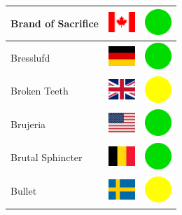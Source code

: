 \documentclass[12pt, a4paper, twoside]{report}
\begin{document}
\begin{center}
\begin{longtable}{|p{5cm}|p{2cm}|p{2cm}|}
 Brand of Sacrifice                                         & \includegraphics[width=1cm]{../img/flags/ca} &   \includegraphics[width=1cm]{../likes/y} \\ \hline
 Bresslufd                                                  & \includegraphics[width=1cm]{../img/flags/de} &   \includegraphics[width=1cm]{../likes/y} \\ \hline
 Broken Teeth                                               & \includegraphics[width=1cm]{../img/flags/gb} &   \includegraphics[width=1cm]{../likes/m} \\ \hline
 Brujeria                                                   & \includegraphics[width=1cm]{../img/flags/us} &   \includegraphics[width=1cm]{../likes/y} \\ \hline
 Brutal Sphincter                                           & \includegraphics[width=1cm]{../img/flags/be} &   \includegraphics[width=1cm]{../likes/y} \\ \hline
 Bullet                                                     & \includegraphics[width=1cm]{../img/flags/se} &   \includegraphics[width=1cm]{../likes/m} \\ \hline

\end{longtable}
\end{center}
\end{document}
